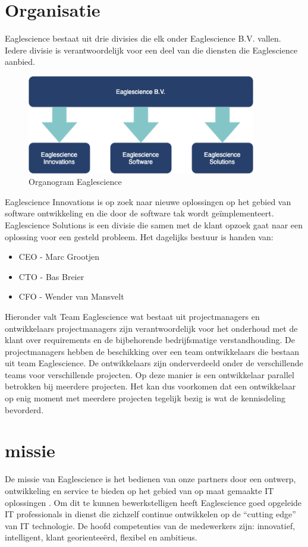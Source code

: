 \section{Organisatie}
Eaglescience bestaat uit drie divisies die elk onder Eaglescience B.V. vallen. Iedere divisie is verantwoordelijk voor een deel van die diensten die Eaglescience aanbied.
\begin{figure}[bth]
\myfloatalign
\includegraphics[width=10cm]{gfx/organogram}
\caption{Organogram Eaglescience}
\label{fig:Eaglescience organogram}
\end{figure}
Eaglescience Innovations is op zoek naar nieuwe oplossingen op het gebied van software ontwikkeling en  die door de software tak wordt ge\"implementeert. Eaglescience Solutions is een divisie die samen met de klant opzoek gaat naar
een oplossing voor een gesteld probleem.
Het dagelijks bestuur is handen van:
\begin{itemize}
\item CEO - Marc Grootjen
\item CTO - Bas Breier
\item CFO - Wender van Mansvelt \\
\end{itemize}
Hieronder valt Team Eaglescience wat bestaat uit projectmanagers en ontwikkelaars
projectmanagers zijn verantwoordelijk voor het onderhoud met de klant over requirements en de bijbehorende bedrijfsmatige verstandhouding. De projectmanagers hebben de beschikking over een team ontwikkelaars die bestaan uit team Eaglescience. De ontwikkelaars zijn onderverdeeld onder de verschillende teams voor verschillende projecten. Op deze manier is een ontwikkelaar parallel betrokken bij meerdere projecten. Het kan dus voorkomen dat een ontwikkelaar op enig moment met meerdere projecten tegelijk bezig is wat de kennisdeling bevorderd.

\section{missie}
De missie van Eaglescience is het bedienen van onze partners door een ontwerp, ontwikkeling en service te bieden op het gebied van op maat gemaakte IT oplossingen . Om dit te kunnen bewerkstelligen heeft Eaglescience goed opgeleide IT professionals in dienst die zichzelf continue ontwikkelen op de “cutting edge” van IT technologie. De hoofd competenties van de medewerkers zijn: innovatief, intelligent, klant georientee\"erd, flexibel en ambitieus.

